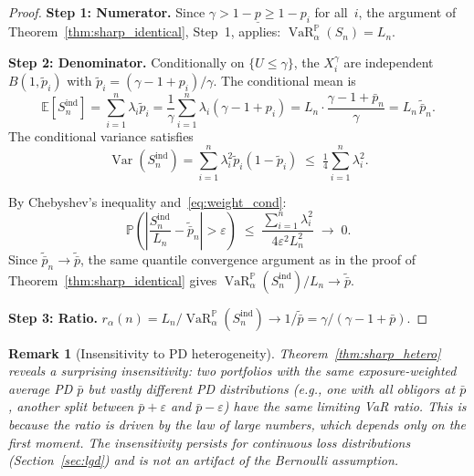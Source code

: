 \documentclass[11pt]{article}
\newtheorem{remark}[theorem]{Remark}
\theoremstyle{definition}
\newcommand{\E}{\mathbb{E}}
\newcommand{\Var}{\operatorname{Var}}
\newcommand{\VaR}{\operatorname{VaR}}
\newcommand{\PP}{\mathbb{P}}
\newcommand{\1}{\mathbf{1}}
\begin{document}
\begin{proof}
\textbf{Step 1: Numerator.} Since $\gamma > 1 - \underline{p} \geq 1 - p_i$ for all~$i$, the argument of Theorem~\ref{thm:sharp_identical}, Step~1, applies: $\VaR_\alpha^\PP(S_n) = L_n$.

\textbf{Step 2: Denominator.} Conditionally on $\{U \leq \gamma\}$, the $X_i^\gamma$ are independent $B(1, \tilde{p}_i)$ with $\tilde{p}_i = (\gamma - 1 + p_i)/\gamma$. The conditional mean is
\begin{equation}\label{eq:hetero_mean}
  \E[S_n^{\mathrm{ind}}] = \sum_{i=1}^n \lambda_i \tilde{p}_i
  = \frac{1}{\gamma}\sum_{i=1}^n \lambda_i(\gamma - 1 + p_i)
  = L_n \cdot \frac{\gamma - 1 + \bar{p}_n}{\gamma}
  = L_n \,\tilde{\bar{p}}_n.
\end{equation}
The conditional variance satisfies
\begin{equation}\label{eq:hetero_var}
  \Var(S_n^{\mathrm{ind}}) = \sum_{i=1}^n \lambda_i^2 \tilde{p}_i(1 - \tilde{p}_i) \;\leq\; \tfrac{1}{4}\sum_{i=1}^n \lambda_i^2.
\end{equation}

By Chebyshev's inequality and~\eqref{eq:weight_cond}:
\[
  \PP\!\left(\left|\frac{S_n^{\mathrm{ind}}}{L_n} - \tilde{\bar{p}}_n\right| > \varepsilon\right)
  \;\leq\; \frac{\sum_{i=1}^n \lambda_i^2}{4\varepsilon^2 L_n^2} \;\to\; 0.
\]
Since $\tilde{\bar{p}}_n \to \tilde{\bar{p}}$, the same quantile convergence argument as in the proof of Theorem~\ref{thm:sharp_identical} gives $\VaR_\alpha^\PP(S_n^{\mathrm{ind}})/L_n \to \tilde{\bar{p}}$.

\textbf{Step 3: Ratio.} $r_\alpha(n) = L_n / \VaR_\alpha^\PP(S_n^{\mathrm{ind}}) \to 1/\tilde{\bar{p}} = \gamma/(\gamma - 1 + \bar{p})$.
\end{proof}

\begin{remark}[Insensitivity to PD heterogeneity]\label{rem:insensitivity}
Theorem~\ref{thm:sharp_hetero} reveals a surprising insensitivity: two portfolios with the same exposure-weighted average PD $\bar{p}$ but vastly different PD distributions (e.g., one with all obligors at $\bar{p}$, another split between $\bar{p} + \varepsilon$ and $\bar{p} - \varepsilon$) have the same limiting VaR ratio. This is because the ratio is driven by the law of large numbers, which depends only on the first moment. The insensitivity persists for continuous loss distributions (Section~\ref{sec:lgd}) and is not an artifact of the Bernoulli assumption.
\end{remark}
\end{document}
